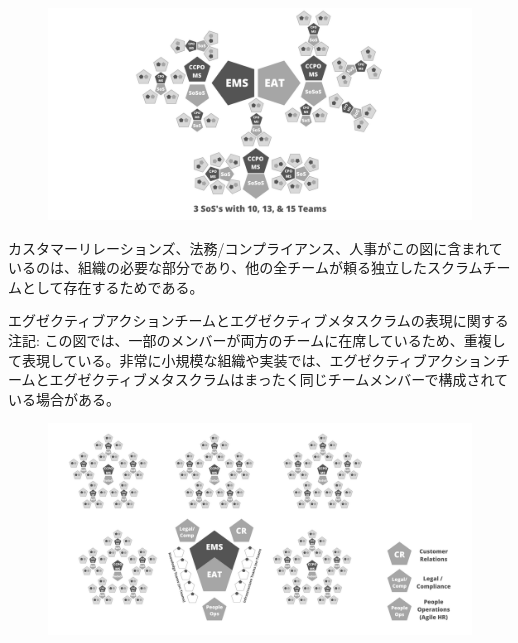 \documentclass[12pt,a4paper,parskip=full]{scrartcl}
\begin{document}
\begin{figure}[H]
    \centering
    \includegraphics[scale=0.15]{5.png}
\end{figure}

カスタマーリレーションズ、法務/コンプライアンス、人事がこの図に含まれているのは、組織の必要な部分であり、他の全チームが頼る独立したスクラムチームとして存在するためである。

エグゼクティブアクションチームとエグゼクティブメタスクラムの表現に関する注記: この図では、一部のメンバーが両方のチームに在席しているため、重複して表現している。非常に小規模な組織や実装では、エグゼクティブアクションチームとエグゼクティブメタスクラムはまったく同じチームメンバーで構成されている場合がある。

\begin{figure}[H]
    \centering
    \includegraphics[scale=0.15]{6.png}
\end{figure}
\end{document}
